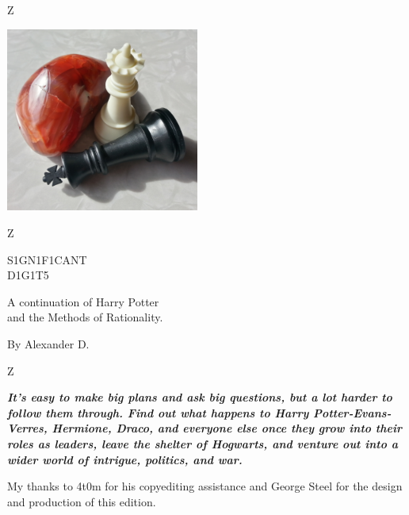\thispagestyle{empty}
\begin{center}
\leavevmode\null\LARGE\cleaders\hbox{\kding Z}\hfill\null

\medskip
\includegraphics[width=2.5in]{titlepic.png}
\medskip

\leavevmode\null\LARGE\cleaders\hbox{\kding Z}\hfill\null

\vfill

\titlepagefont\HUGE
S1GN1F1CANT\\
\fontsize{48}{48}\selectfont D1G1T5\kern-4pt\null
\vspace{18pt}

\titlefont\large

A continuation of Harry Potter\\
and the Methods of Rationality.

\vfill\vfill


\huge
By Alexander D.

\vfill

\leavevmode\null\LARGE\cleaders\hbox{\kding Z}\hfill\null
\end{center}
\clearpage
\thispagestyle{plain}

\null\vfill
\null\hfill\begin{minipage}{3in}
\bfseries\itshape\noindent It's easy to make big plans and ask big questions, but a lot harder to follow them through.  Find out what happens to Harry Potter-Evans-Verres, Hermione, Draco, and everyone else once they grow into their roles as leaders, leave the shelter of Hogwarts, and venture out into a wider world of intrigue, politics, and war.
\end{minipage}\hfill\null

\vfill

\null\hfill\begin{minipage}{3in}
My thanks to 4t0m for his copyediting assistance and George Steel for the design and production of this edition.
\end{minipage}\hfill\null

\vfill\null
\clearpage

